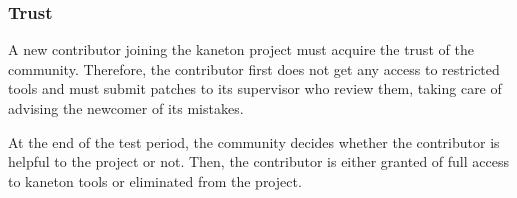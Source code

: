 
\subsubsection{Trust}

A new contributor joining the kaneton project must acquire the trust of
the community. Therefore, the contributor first does not get any access
to restricted tools and must submit patches to its supervisor who review
them, taking care of advising the newcomer of its mistakes.

At the end of the test period, the community decides whether the contributor
is helpful to the project or not. Then, the contributor is either granted
of full access to kaneton tools or eliminated from the project.
